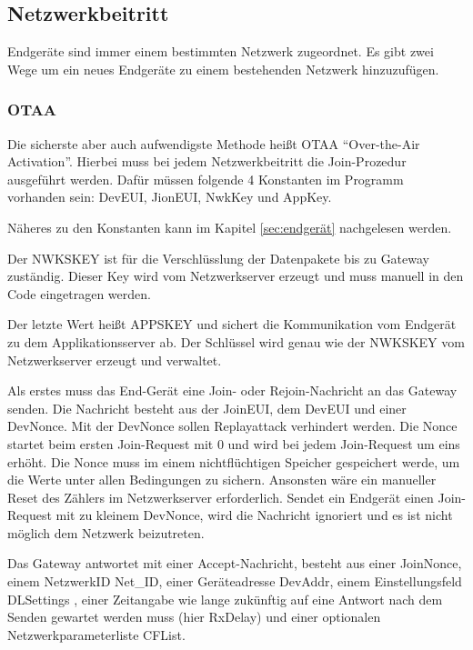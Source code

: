 \documentclass[a4paper, 12pt]{article}
\begin{document}
        \subsection{Netzwerkbeitritt}
            Endgeräte sind immer einem bestimmten Netzwerk zugeordnet. Es gibt zwei Wege um ein neues Endgeräte zu einem 
            bestehenden Netzwerk hinzuzufügen.
            \subsubsection{OTAA} \label{sec:OTAA}
                Die sicherste aber auch aufwendigste Methode heißt 
                OTAA ``Over-the-Air Activation''. Hierbei muss bei jedem Netzwerkbeitritt die Join-Prozedur ausgeführt
                werden. Dafür müssen folgende 4 Konstanten im Programm vorhanden sein: DevEUI, 
                JionEUI, NwkKey und AppKey.

                Näheres zu den Konstanten kann im Kapitel \ref{sec:endgerät}  nachgelesen werden.

                Der NWKSKEY ist für die Verschlüsslung der Datenpakete bis zu Gateway zuständig. Dieser Key wird 
                vom Netzwerkserver erzeugt und muss manuell in den Code eingetragen werden.\cite[S.3]{LoRaSecur}
            
                Der letzte Wert heißt APPSKEY und sichert die Kommunikation vom Endgerät zu dem Applikationsserver ab. 
                Der Schlüssel wird genau wie der NWKSKEY vom Netzwerkserver erzeugt und verwaltet.\cite[S.3]{LoRaSecur}

                Als erstes muss das End-Gerät eine Join- oder Rejoin-Nachricht an das Gateway senden. Die Nachricht besteht aus der 
                JoinEUI, dem DevEUI und einer DevNonce. Mit der DevNonce sollen Replayattack verhindert werden. Die
                Nonce startet beim ersten Join-Request mit 0 und wird bei jedem Join-Request um eins erhöht. 
                Die Nonce muss im einem nichtflüchtigen Speicher gespeichert werde, um die Werte unter allen Bedingungen 
                zu sichern. Ansonsten wäre ein manueller Reset des Zählers im Netzwerkserver erforderlich.
                Sendet ein Endgerät einen Join-Request mit zu kleinem DevNonce, wird die Nachricht ignoriert und es 
                ist nicht möglich dem Netzwerk 
                beizutreten.

                Das Gateway antwortet mit einer Accept-Nachricht, besteht aus einer JoinNonce, einem NetzwerkID Net\_ID, einer Geräteadresse DevAddr,
                einem Einstellungsfeld DLSettings , einer Zeitangabe wie lange zukünftig auf eine Antwort nach dem
                Senden gewartet werden muss (hier RxDelay) und einer optionalen Netzwerkparameterliste CFList.
\end{document}
